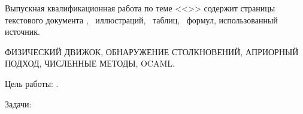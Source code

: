 
Выпускная квалификационная работа по теме <<\Topic>> содержит
\pageref{LastPage} страницы текстового документа \TODO, %
\totalfigures~иллюстраций,
\totaltables~таблиц,
\totalequations~формул,
 использованный источник.

\MakeUppercase{
    физический движок,
    обнаружение столкновений,
    априорный подход,
    численные методы,
    OCaml.
}

Цель работы: \Target.

Задачи:

\Tasks
